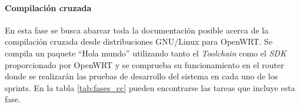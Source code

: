 \documentclass[12pt, twoside]{article}
\begin{document}
        \begin{table}[h!]             
            \centering                  
            \caption{Descripción de la face Boceto}
            \label{tab:fases_boc}
        \end{table}
        
        \paragraph{ Compilación cruzada}
        En esta fase se busca abarcar toda la documentación posible acerca de la compilación cruzada desde distribuciones GNU/Linux para OpenWRT. Se compila un paquete ``Hola mundo'' utilizando tanto el \textit{Toolchain} como el \textit{SDK} proporcionado por OpenWRT \cite{SDK} y se comprueba su funcionamiento en el router donde se realizarán las pruebas de desarrollo del sistema en cada uno de los sprints. En la tabla \ref{tab:fases_cc} pueden encontrarse las tareas que incluye esta fase.
\end{document}
